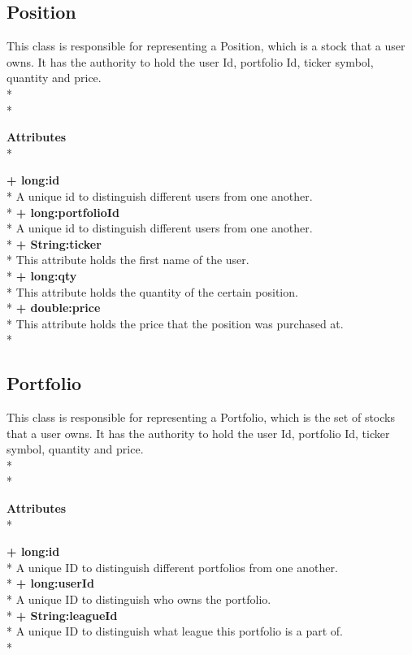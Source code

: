 \subsection{Position}
This class is responsible for representing a Position, which is a stock that a
user owns. It has the authority to hold the user Id, portfolio Id, ticker
symbol, quantity and price.\\* \\*

{\bfseries Attributes} \\*

{\bfseries + long:id} \\*
A unique id to distinguish different users from one another. \\*
{\bfseries + long:portfolioId} \\*
A unique id to distinguish different users from one another. \\*
{\bfseries + String:ticker} \\*
This attribute holds the first name of the user. \\*
{\bfseries + long:qty} \\*
This attribute holds the quantity of the certain position.\\*
{\bfseries + double:price} \\*
This attribute holds the price that the position was purchased at.\\*

\subsection{Portfolio}
This class is responsible for representing a Portfolio, which is the set of
stocks that a user owns. It has the authority to hold the user Id, portfolio
Id, ticker symbol, quantity and price. \\* \\*

{\bfseries Attributes} \\*

{\bfseries + long:id} \\*
A unique ID to distinguish different portfolios from one another.\\*
{\bfseries + long:userId} \\*
A unique ID to distinguish who owns the portfolio. \\*
{\bfseries + String:leagueId} \\*
A unique ID to distinguish what league this portfolio is a part of. \\*

